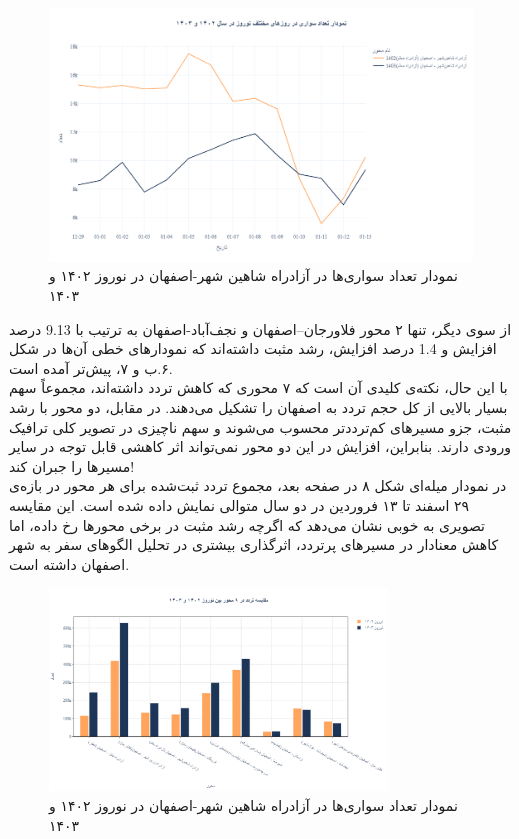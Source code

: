 \documentclass[a4paper, 12pt]{article}
\begin{document}
\newpage
\begin{figure}[htbp]
    \centering
    \includegraphics[width=1\textwidth]{compare_215104.png}
    \caption{نمودار تعداد سواری‌ها در آزادراه شاهین شهر-اصفهان در نوروز ۱۴۰۲ و ۱۴۰۳}
\end{figure}

از سوی دیگر، تنها ۲ محور فلاورجان–اصفهان و نجف‌آباد-اصفهان به ترتیب با
9.13
درصد افزایش و 
1.4
درصد افزایش، رشد مثبت داشته‌اند که نمودارهای خطی آن‌ها در شکل ۶.ب و ۷، پیش‌تر آمده است.
\\

با این حال، نکته‌ی کلیدی آن است که ۷ محوری که کاهش تردد داشته‌اند، مجموعاً سهم بسیار بالایی از کل حجم تردد به اصفهان را تشکیل می‌دهند. در مقابل، دو محور با رشد مثبت، جزو مسیرهای کم‌ترددتر محسوب می‌شوند و سهم ناچیزی در تصویر کلی ترافیک ورودی دارند. بنابراین، افزایش در این دو محور نمی‌تواند اثر کاهشی قابل توجه در سایر مسیرها را جبران کند!
\\

در نمودار میله‌ای شکل ۸ در صفحه بعد، مجموع تردد ثبت‌شده برای هر محور در بازه‌ی ۲۹ اسفند تا ۱۳ فروردین در دو سال متوالی نمایش داده شده است. این مقایسه تصویری به خوبی نشان می‌دهد که اگرچه رشد مثبت در برخی محورها رخ داده، اما کاهش معنادار در مسیرهای پرتردد، اثرگذاری بیشتری در تحلیل الگوهای سفر به شهر اصفهان داشته است.
\begin{figure}[htbp]
    \centering
    \includegraphics[width=0.8\textwidth]{isfahan_all_roads.png}
    \caption{نمودار تعداد سواری‌ها در آزادراه شاهین شهر-اصفهان در نوروز ۱۴۰۲ و ۱۴۰۳}
\end{figure}
\end{document}
